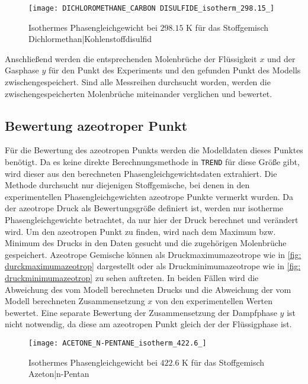\documentclass[../thesis.tex]{subfiles}
\begin{document}
\begin{figure}[htb]
	\centering
	\texttt{[image: DICHLOROMETHANE\_CARBON DISULFIDE\_isotherm\_298.15\_]}
	\caption{Isothermes Phasengleichgewicht bei $ 298$.$15$ K für das Stoffgemisch Dichlormethan|Kohlenstoffdisulfid}
	\label{fig: phase_eq_datenausschluss}
\end{figure}

Anschließend werden die entsprechenden Molenbrüche der Flüssigkeit $x$ und der Gasphase $y$ für den Punkt des Experiments und den gefunden Punkt des Modells zwischengespeichert. Sind alle Messreihen durchsucht worden, werden die zwischengespeicherten Molenbrüche miteinander verglichen und bewertet.

\subsection{Bewertung azeotroper Punkt}

Für die Bewertung des azeotropen Punkts werden die Modelldaten dieses Punktes benötigt. Da es keine direkte Berechnungsmethode in \texttt{TREND} für diese Größe gibt, wird dieser aus den berechneten Phasengleichgewichtsdaten extrahiert. Die Methode durchsucht nur diejenigen Stoffgemische, bei denen in den experimentellen Phasengleichgewichten azeotrope Punkte vermerkt wurden. Da der azeotrope Druck als Bewertungsgröße definiert ist, werden nur isotherme Phasengleichgewichte betrachtet, da nur hier der Druck berechnet und verändert wird. Um den azeotropen Punkt zu finden, wird nach dem Maximum bzw. Minimum des Drucks in den Daten gesucht und die zugehörigen Molenbrüche gespeichert. Azeotrope Gemische können als Druckmaximumazeotrope wie in \autoref{fig: durckmaximumazeotrop} dargestellt oder als Druckminimumazeotrope wie in \autoref{fig: druckminimumazeotrop} zu sehen auftreten. In beiden Fällen wird die Abweichung des vom Modell berechneten Drucks und die Abweichung der vom Modell berechneten Zusammensetzung $x$ von den experimentellen Werten bewertet. Eine separate Bewertung der Zusammensetzung der Dampfphase $y$ ist nicht notwendig, da diese am azeotropen Punkt gleich der der Flüssigphase ist. 

\begin{figure}[htb]
	\centering
	\texttt{[image: ACETONE\_N-PENTANE\_isotherm\_422.6\_]}
	\caption{Isothermes Phasengleichgewicht bei $ 422$.$6$ K für das Stoffgemisch Azeton|n-Pentan}
	\label{fig: durckmaximumazeotrop}
\end{figure}
\end{document}
